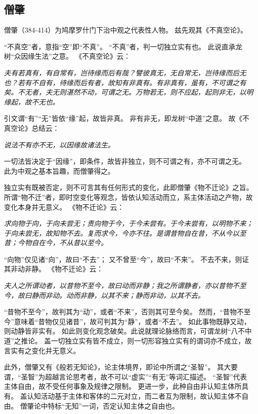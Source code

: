\documentclass[11pt]{article}
\begin{document}
\subsection{僧肇}
僧肇（384-414）为鸠摩罗什门下治中观之代表性人物。
兹先观其《不真空论》。

\par

“不真空”者，意指“空”即“不真”。
“不真”者，判一切独立实有也。
此说直承龙树“众因缘生法”之意。
《不真空论》云：

\textit{夫有若真有，有自常有，岂待缘而后有哉？譬彼真无，无自常无，岂待缘而后无也？若有不自有，待缘而后有者，故知有非真有。有非真有，虽有，不可谓之有矣。不无者，夫无则湛然不动，可谓之无。万物若无，则不应起，起则非无，以明缘起，故不无也。}

引文谓“有”“无”皆依“缘”起，故皆非真。
非有非无，即龙树“中道”之意。
故《不真空论》总结云：

\textit{说法不有亦不无，以因缘故诸法生。}

一切法皆决定于“因缘”，即条件，故皆非独立，则不可谓之有，亦不可谓之无。
此为中观之基本旨趣，而僧肇得之。

\par

独立实有既被否定，则不可言其有任何形式的变化，此即僧肇《物不迁论》之旨。
所谓“物不迁”者，即时空变化等观念，皆依认知活动而立，系主体活动之产物，故变化本身并无意义。
《物不迁论》云：

\textit{求向物于向，于向未尝无；责向物于今，于今未尝有。于今未尝有，以明物不来；于向未尝无，故知物不去。复而求今，今亦不往。是谓昔物自在昔，不从今以至昔；今物自在今，不从昔以至今。}

“向物”仅见诸“向”，故曰“不去”；
又不曾至“今”，故曰“不来”。
不去不来，则证其非动非静。
《物不迁论》云：

\textit{夫人之所谓动者，以昔物不至今，故曰动而非静；我之所谓静者，亦以昔物不至今，故曰静而非动。动而非静，以其不来；静而非动，以其不去。}

“昔物不至今”，故判其为“动”，或者“不来”，否则其可至今矣。
然而，“昔物不至今”意味着“昔物仅见诸昔”，故可判其为“静”，或者“不去”。
如此事物既静又动，则动静皆非实有。
如此则变化观念破矣。此说就理论脉络而言，可谓龙树“八不中道”之推论。
盖一切独立实有皆不成立，则一切形容独立实有的谓词亦不成立，故言实有之变化并无意义。

\par

此外，僧肇又有《般若无知论》，论主体境界，即论中所谓之“圣智”。
其大要谓，“圣智”为超越言论思考者，故不可以“虚实”“有无”等词汇描述。
“圣智”代表主体自由，故不受任何事象及规律之限制。
更进一步，此种自由非认知主体所具有。
盖认知活动基于主体和客体的二元对立，而二者互为限制，故认知主体不自由。
僧肇论中特标“无知”一词，否定认知主体之自由也。
\end{document}
